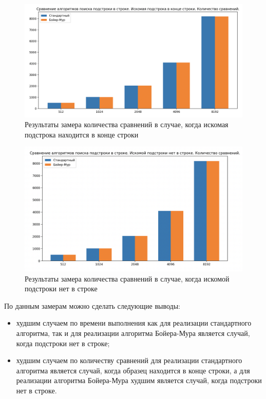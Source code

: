 \begin{figure}[h]
    \centering
    \includegraphics[width=1\linewidth]{img/endC.png}
    \caption{Результаты замера количества сравнений в случае, когда искомая подстрока находится в конце строки}
    \label{img:endC}
\end{figure}

\begin{figure}[h]
    \includegraphics[width=1\linewidth]{img/noC.png}
    \caption{Результаты замера количества сравнений в случае, когда искомой подстроки нет в строке}
    \label{img:noC}
\end{figure}
\clearpage

По данным замерам можно сделать следующие выводы:
\begin{itemize}
    \item худшим случаем по времени выполнения как для реализации стандартного алгоритма, так и для реализации алгоритма Бойера-Мура
    является случай, когда подстроки нет в строке;
    \item худшим случаем по количеству сравнений для реализации стандартного алгоритма является
    случай, когда образец находится в конце строки, а для реализации алгоритма Бойера-Мура худшим
    является случай, когда подстроки нет в строке.
\end{itemize}


